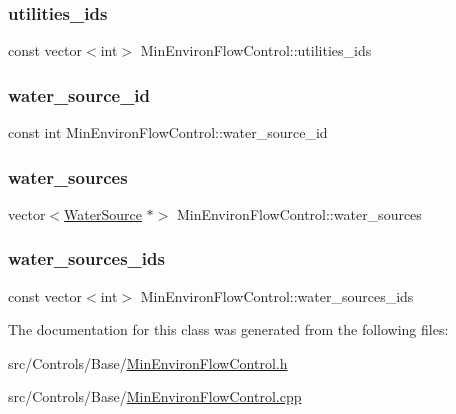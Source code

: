 \subsubsection{\texorpdfstring{utilities\+\_\+ids}{utilities\_ids}}
{\footnotesize\ttfamily const vector$<$int$>$ Min\+Environ\+Flow\+Control\+::utilities\+\_\+ids}

\mbox{\label{classMinEnvironFlowControl_a571d4d56086eb752aebb20b2d85fa8e7}} 
\subsubsection{\texorpdfstring{water\+\_\+source\+\_\+id}{water\_source\_id}}
{\footnotesize\ttfamily const int Min\+Environ\+Flow\+Control\+::water\+\_\+source\+\_\+id}

\mbox{\label{classMinEnvironFlowControl_ac5be281d802ad1de433bed588bb13cfe}} 
\subsubsection{\texorpdfstring{water\+\_\+sources}{water\_sources}}
{\footnotesize\ttfamily vector$<$\mbox{\hyperlink{classWaterSource}{Water\+Source}} $\ast$$>$ Min\+Environ\+Flow\+Control\+::water\+\_\+sources\hspace{0.3cm}{\ttfamily [protected]}}

\mbox{\label{classMinEnvironFlowControl_a1544571a77557853d0cc8189bd29f4b3}} 
\subsubsection{\texorpdfstring{water\+\_\+sources\+\_\+ids}{water\_sources\_ids}}
{\footnotesize\ttfamily const vector$<$int$>$ Min\+Environ\+Flow\+Control\+::water\+\_\+sources\+\_\+ids}



The documentation for this class was generated from the following files\+:\begin{DoxyCompactItemize}
\item 
src/\+Controls/\+Base/\mbox{\hyperlink{MinEnvironFlowControl_8h}{Min\+Environ\+Flow\+Control.\+h}}\item 
src/\+Controls/\+Base/\mbox{\hyperlink{MinEnvironFlowControl_8cpp}{Min\+Environ\+Flow\+Control.\+cpp}}\end{DoxyCompactItemize}
